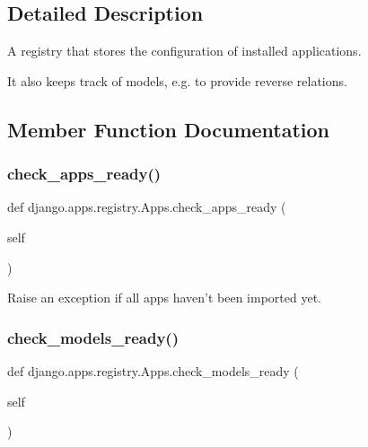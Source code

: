 \subsection{Detailed Description}
\begin{DoxyVerb}A registry that stores the configuration of installed applications.

It also keeps track of models, e.g. to provide reverse relations.
\end{DoxyVerb}
 

\subsection{Member Function Documentation}
\mbox{\label{classdjango_1_1apps_1_1registry_1_1_apps_ad6fb1dd4c6fe9a6eda870a8bd40637fe}} 
\subsubsection{\texorpdfstring{check\+\_\+apps\+\_\+ready()}{check\_apps\_ready()}}
{\footnotesize\ttfamily def django.\+apps.\+registry.\+Apps.\+check\+\_\+apps\+\_\+ready (\begin{DoxyParamCaption}\item[{}]{self }\end{DoxyParamCaption})}

\begin{DoxyVerb}Raise an exception if all apps haven't been imported yet.\end{DoxyVerb}
 \mbox{\label{classdjango_1_1apps_1_1registry_1_1_apps_aecc29621c2c6ba865571c4a80f8ae16b}} 
\subsubsection{\texorpdfstring{check\+\_\+models\+\_\+ready()}{check\_models\_ready()}}
{\footnotesize\ttfamily def django.\+apps.\+registry.\+Apps.\+check\+\_\+models\+\_\+ready (\begin{DoxyParamCaption}\item[{}]{self }\end{DoxyParamCaption})}


